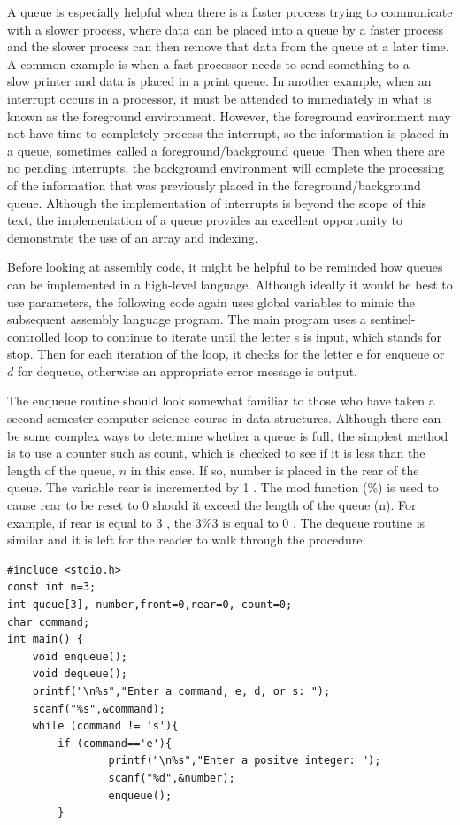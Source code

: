\documentclass[10pt]{article}
\begin{document}
A queue is especially helpful when there is a faster process trying to communicate with a slower process, where data can be placed into a queue by a faster process and the slower process can then remove that data from the queue at a later time. A common example is when a fast processor needs to send something to a\\
slow printer and data is placed in a print queue. In another example, when an interrupt occurs in a processor, it must be attended to immediately in what is known as the foreground environment. However, the foreground environment may not have time to completely process the interrupt, so the information is placed in a queue, sometimes called a foreground/background queue. Then when there are no pending interrupts, the background environment will complete the processing of the information that was previously placed in the foreground/background queue. Although the implementation of interrupts is beyond the scope of this text, the implementation of a queue provides an excellent opportunity to demonstrate the use of an array and indexing.

Before looking at assembly code, it might be helpful to be reminded how queues can be implemented in a high-level language. Although ideally it would be best to use parameters, the following code again uses global variables to mimic the subsequent assembly language program. The main program uses a sentinel-controlled loop to continue to iterate until the letter s is input, which stands for stop. Then for each iteration of the loop, it checks for the letter e for enqueue or $d$ for dequeue, otherwise an appropriate error message is output.

The enqueue routine should look somewhat familiar to those who have taken a second semester computer science course in data structures. Although there can be some complex ways to determine whether a queue is full, the simplest method is to use a counter such as count, which is checked to see if it is less than the length of the queue, $n$ in this case. If so, number is placed in the rear of the queue. The variable rear is incremented by 1 . The mod function (\%) is used to cause rear to be reset to 0 should it exceed the length of the queue (n). For example, if rear is equal to 3 , the $3 \% 3$ is equal to 0 . The dequeue routine is similar and it is left for the reader to walk through the procedure:

\begin{verbatim}
#include <stdio.h>
const int n=3;
int queue[3], number,front=0,rear=0, count=0;
char command;
int main() {
    void enqueue();
    void dequeue();
    printf("\n%s","Enter a command, e, d, or s: ");
    scanf("%s",&command);
    while (command != 's'){
        if (command=='e'){
                printf("\n%s","Enter a positve integer: ");
                scanf("%d",&number);
                enqueue();
        }
\end{verbatim}
\end{document}
